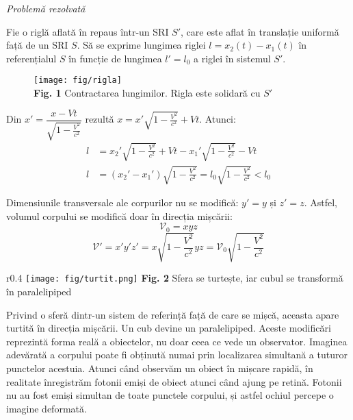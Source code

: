 \documentclass[a4paper, 12pt]{article}
\newcommand{\parbreak}{\vspace{1cm}}
\newcommand{\figcaption}[2]{\scriptsize{\textbf{Fig. #1} #2}}
\newcommand{\lorentzradical}{\sqrt{1 - \frac{V^2}{c^2}}}
\begin{document}
{\Large\emph{Problemă rezolvată}}
\vspace{0.5cm}

Fie o riglă aflată în repaus într-un SRI $S'$, care este aflat în translație
uniformă față de un SRI $S$. Să se exprime lungimea riglei \( l = x_2(t) - x_1(t) \)
în referențialul $S$ în funcție de lungimea \( l' = l_0 \)
a riglei în sistemul $S'$.

\begin{figure}[h]
    \centering
    \texttt{[image: fig/rigla]} \\
    \figcaption{1}{Contractarea lungimilor. Rigla este solidară cu $S'$}
\end{figure}

Din \( x' = \dfrac{x - Vt}{\lorentzradical} \)
rezultă \( x = x' \lorentzradical + Vt \). Atunci:
\begin{align*}
    l &= x_2' \lorentzradical + Vt - x_1' \lorentzradical - Vt \\
    l &= (x_2' - x_1') \lorentzradical = l_0 \lorentzradical < l_0
\end{align*}

\parbreak

Dimensiunile transversale ale corpurilor nu se modifică: \( y' = y \) și \( z' = z \).
Astfel, volumul corpului se modifică doar în direcția mișcării:
\[ \mathscr{V}_0 = xyz \]
\[ \mathscr{V}' = x'y'z' = x\lorentzradical yz = \mathscr{V}_0 \lorentzradical \]

\begin{wrapfigure}{r}{0.4\textwidth}
    \centering
    \texttt{[image: fig/turtit.png]}
    \figcaption{2}{Sfera se turtește, iar cubul se transformă în paralelipiped}
\end{wrapfigure}

Privind o sferă dintr-un sistem de referință față de care se mișcă, aceasta
apare turtită în direcția mișcării. Un cub devine un paralelipiped.
Aceste modificări reprezintă forma reală a obiectelor, nu doar ceea ce vede
un observator. Imaginea adevărată a corpului poate fi obținută numai prin
localizarea simultană a tuturor punctelor acestuia. Atunci când observăm un
obiect în mișcare rapidă, în realitate înregistrăm fotonii emiși de obiect
atunci când ajung pe retină. Fotonii nu au fost emiși simultan de toate punctele
corpului, și astfel ochiul percepe o imagine deformată.
\end{document}
